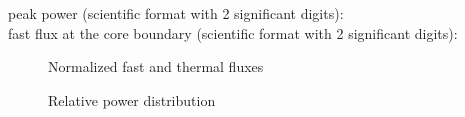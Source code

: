 \documentclass[11pt,a4paper]{article}
\begin{document}
peak power (scientific format with 2 significant digits): \\

fast flux at the core boundary (scientific format with 2 significant digits): \\

\begin{figure}[h]
	\centering
	\caption{Normalized fast and thermal fluxes}
\end{figure}

\begin{figure}[h]
	\centering
	\caption{Relative power distribution}
\end{figure}



\end{document}
